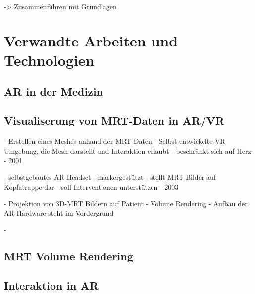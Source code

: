 
-> Zusammenführen mit Grundlagen
\chapter{Verwandte Arbeiten und Technologien}
% 
\label{related}

\section{AR in der Medizin}

\section{Visualiserung von MRT-Daten in AR/VR}

\cite{SORENSEN2001193}
- Erstellen eines Meshes anhand der MRT Daten
- Selbst entwickelte VR Umgebung, die Mesh darstellt und Interaktion erlaubt
- beschränkt sich auf Herz
- 2001

\cite{PMID:12635021}
- selbstgebautes AR-Headset
- markergestützt
- stellt MRT-Bilder auf Kopfatrappe dar
- soll Interventionen unterstützen
- 2003

\cite{Watts:2017:PAR:3139131.3141198}
- Projektion von 3D-MRT Bildern auf Patient
- Volume Rendering
- Aufbau der AR-Hardware steht im Vordergrund

\cite{Ghoshal:2017:STV:3173519.3173527}
-

\section{MRT Volume Rendering}

\section{Interaktion in AR}

